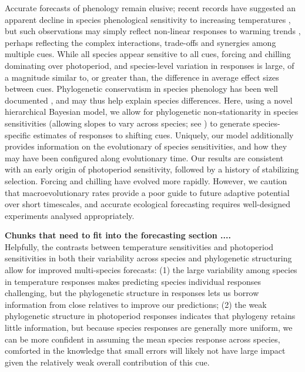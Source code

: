 \documentclass{article}\usepackage[]{graphicx}\usepackage[]{color}
\begin{document}
Accurate forecasts of phenology remain elusive; recent records have suggested an apparent decline in species phenological sensitivity to increasing temperatures \citep{fu2015,piao2017}, but such observations may simply reflect non-linear responses to warming trends \citep{wolkovich2021simple}, perhaps reflecting the complex interactions, trade-offs and synergies among multiple cues. While all species appear sensitive to all cues, forcing and chilling dominating over photoperiod, and species-level variation in responses is large, of a magnitude similar to, or greater than, the difference in average effect sizes between cues. Phylogenetic conservatism in species phenology has been well documented \citep{davies2013phylogenetic,rafferty2017global,joly2019importance}, and may thus help explain species differences. Here, using a novel hierarchical Bayesian model, we allow for phylogenetic non-stationarity in species sensitivities (allowing slopes to vary across species; see \citep{davies2019phylogenetically}) to generate species-specific estimates of responses to shifting cues. Uniquely, our model additionally provides information on the evolutionary of species sensitivities, and how they may have been configured along evolutionary time. Our results are consistent with an early origin of photoperiod sensitivity, followed by a history of stabilizing selection. Forcing and chilling have evolved more rapidly. However, we caution that macroevolutionary rates provide a poor guide to future adaptive potential over short timescales, and accurate ecological forecasting requires well-designed experiments analysed appropriately.

{\bf Chunks that need to fit into the forecasting section ....}\\
Helpfully, the contrasts between temperature sensitivities and photoperiod sensitivities in both their variability across species and phylogenetic structuring allow for improved multi-species forecasts: (1) the large variability among species in temperature responses makes predicting species individual responses challenging, but the phylogenetic structure in responses lets us borrow  information from close relatives to improve our predictions; (2) the weak phylogenetic structure in photoperiod responses indicates that phylogeny retains little information, but because species responses are generally more uniform, we can be more confident in assuming the mean species response across species, comforted in the knowledge that small errors will likely not have large impact given the relatively weak overall contribution of this cue.
\end{document}

